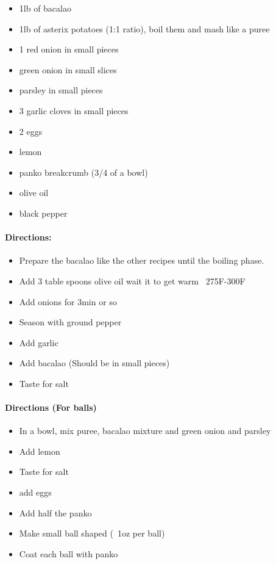 \documentclass{article}
\begin{document}
\begin{itemize}
	\item 1lb of bacalao
	\item 1lb of asterix potatoes (1:1 ratio), boil them and mash like a puree
	\item 1 red onion in small pieces
	\item green onion in small slices
	\item parsley in small pieces
	\item 3 garlic cloves in small pieces
	\item 2 eggs
	\item lemon
	\item panko breakcrumb (3/4 of a bowl)
	\item olive oil
	\item black pepper
\end{itemize}

\paragraph{Directions:}
\begin{itemize}
	\item Prepare the bacalao like the other recipes until the boiling phase.
	\item Add 3 table spoons olive oil wait it to get warm ~275F-300F
	\item Add onions for 3min or so
	\item Season with ground pepper
	\item Add garlic
	\item Add bacalao (Should be in small pieces)
	\item Taste for salt
\end{itemize}

\paragraph{Directions (For balls)}
\begin{itemize}
	\item In a bowl, mix puree, bacalao mixture and green onion and parsley
	\item Add lemon
	\item Taste for salt
	\item add  eggs
	\item Add half the panko 
	\item Make small ball shaped (~1oz per ball)
	\item Coat each ball with panko
\end{itemize}
\end{document}
